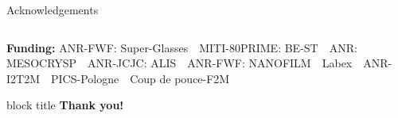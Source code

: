 \documentclass[10pt, aspectratio=169]{beamer}
\begin{document}
\begin{frame}{Acknowledgements}
\begin{columns}[t, onlytextwidth]
    \end{columns}

    \vspace{0.10cm}

    \colorbox{gray!10}{%
        \begin{minipage}{\linewidth}
            \vspace{0.05cm}
            {\scriptsize\color{gray}
            \textbf{Funding:}
            ANR-FWF: Super-Glasses\ \textbullet\
            MITI-80PRIME: BE-ST\ \textbullet\
            ANR: MESOCRYSP\ \textbullet\
            ANR-JCJC: ALIS\ \textbullet\
            ANR-FWF: NANOFILM\ \textbullet\
            Labex\ \textbullet\
            ANR-I2T2M\ \textbullet\
            PICS-Pologne\ \textbullet\
            Coup de pouce-F2M
            }
            \vspace{0.05cm}
        \end{minipage}%
    }

    \vfill
    \begin{beamercolorbox}[wd=\linewidth, rounded=true, center]{block title}
        \centering\small \textbf{Thank you!}
    \end{beamercolorbox}
\end{frame}
\end{document}
